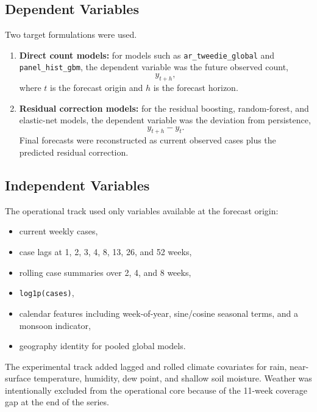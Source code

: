 \documentclass[11pt]{article}
\begin{document}
\subsection{Dependent Variables}
Two target formulations were used.
\begin{enumerate}
    \item \textbf{Direct count models:} for models such as \texttt{ar\_tweedie\_global} and \texttt{panel\_hist\_gbm}, the dependent variable was the future observed count,
    \[
    y_{t+h},
    \]
    where $t$ is the forecast origin and $h$ is the forecast horizon.
    \item \textbf{Residual correction models:} for the residual boosting, random-forest, and elastic-net models, the dependent variable was the deviation from persistence,
    \[
    y_{t+h} - y_t.
    \]
    Final forecasts were reconstructed as current observed cases plus the predicted residual correction.
\end{enumerate}

\subsection{Independent Variables}
The operational track used only variables available at the forecast origin:
\begin{itemize}
    \item current weekly cases,
    \item case lags at 1, 2, 3, 4, 8, 13, 26, and 52 weeks,
    \item rolling case summaries over 2, 4, and 8 weeks,
    \item \texttt{log1p(cases)},
    \item calendar features including week-of-year, sine/cosine seasonal terms, and a monsoon indicator,
    \item geography identity for pooled global models.
\end{itemize}

The experimental track added lagged and rolled climate covariates for rain, near-surface temperature, humidity, dew point, and shallow soil moisture. Weather was intentionally excluded from the operational core because of the 11-week coverage gap at the end of the series.
\end{document}
